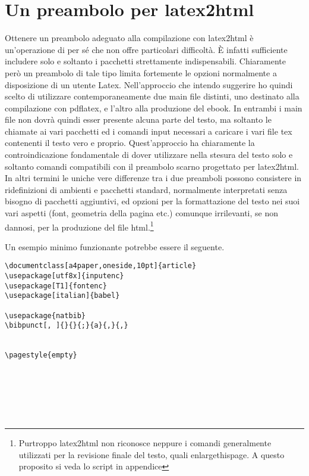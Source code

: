 

\chapter{Un preambolo per latex2html}

Ottenere un preambolo adeguato alla compilazione con latex2html è un'operazione
di per sé che non offre particolari difficoltà. È infatti sufficiente includere
solo e soltanto i pacchetti strettamente indispensabili. Chiaramente però un
preambolo di tale tipo limita fortemente le opzioni normalmente a disposizione
di un utente Latex. Nell'approccio che intendo suggerire ho quindi scelto di
utilizzare contemporaneamente due main file distinti, uno destinato alla
compilazione con pdflatex, e l'altro alla produzione del ebook. In entrambi i
main file non dovrà quindi esser presente alcuna parte del testo, ma soltanto le
chiamate ai vari pacchetti ed i comandi input necessari a caricare i vari file
tex contenenti il testo vero e proprio. Quest'approccio ha chiaramente la
controindicazione fondamentale di dover utilizzare nella stesura del testo solo
e soltanto comandi compatibili con il preambolo scarno progettato per
latex2html. In altri termini le uniche vere differenze tra i due preamboli
possono consistere in ridefinizioni di ambienti e pacchetti standard,
normalmente interpretati senza bisogno di pacchetti aggiuntivi, ed opzioni per
la formattazione del testo nei suoi vari aspetti (font, geometria della pagina
etc.) comunque irrilevanti, se non dannosi, per la produzione del file
html.\footnote
  {Purtroppo latex2html non riconosce neppure i comandi generalmente
  utilizzati per la revisione finale del testo, quali enlargethispage. A questo
  proposito si veda lo script in appendice}

Un esempio minimo funzionante potrebbe essere il seguente.

\begin{lstlisting}
\documentclass[a4paper,oneside,10pt]{article}
\usepackage[utf8x]{inputenc}
\usepackage[T1]{fontenc}
\usepackage[italian]{babel}

\usepackage{natbib}
\bibpunct[, ]{}{}{;}{a}{,}{,}


\pagestyle{empty}







\end{lstlisting}

